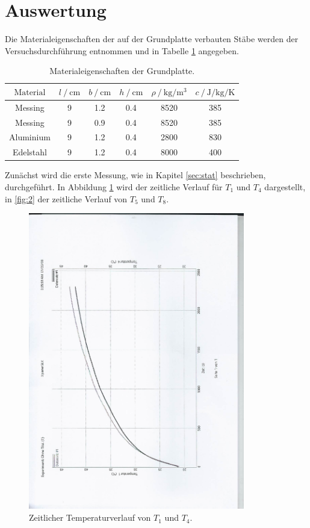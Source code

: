 \section{Auswertung}
\label{sec:Auswertung}

Die Materialeigenschaften der auf der Grundplatte verbauten Stäbe werden der Versuchsdurchführung entnommen und in Tabelle \ref{tab:1} angegeben.

\begin{table}
  \centering
  \caption{Materialeigenschaften der Grundplatte. \cite{sample}}
  \label{tab:1}
  \begin{tabular}{c c c c c c}
    \toprule
    {$\text{Material}$} & {$l \:/\: \si{\centi\metre}$} & {$b \:/\: \si{\centi\metre}$} & {$h \:/\: \si{\centi\metre}$} & {$\rho \:/\: \si{\kilo\gram\per\metre\tothe{3}}$} & {$c \:/\: \si{\joule\per\kilo\gram\per\kelvin} $} \\
    \midrule
    Messing  & 9 & 1.2 & 0.4 & 8520 & 385 \\
    Messing  & 9 & 0.9 & 0.4 & 8520 & 385 \\
    Aluminium  & 9 & 1.2 & 0.4 & 2800 & 830 \\
    Edelstahl  & 9 & 1.2 & 0.4 & 8000 & 400 \\

    \bottomrule
  \end{tabular}
\end{table}

Zunächst wird die erste Messung, wie in Kapitel \ref{sec:stat} beschrieben, durchgeführt.
In Abbildung \ref{fig:1} wird der zeitliche Verlauf für $T_1$ und $T_4$ dargestellt, in \ref{fig:2} der zeitliche Verlauf von $T_5$ und $T_8$.

\begin{figure}
  \centering
  \includegraphics[height=13cm, angle=90]{scan-7.jpg}
  \caption{Zeitlicher Temperaturverlauf von $T_1$ und $T_4$.}
  \label{fig:1}
\end{figure}

